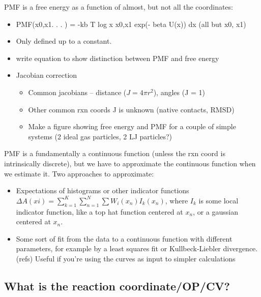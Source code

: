\documentclass[9pt]{livecoms}
\begin{document}
PMF is a free energy as a function of almost, but not all the coordinates:
\begin{itemize}
\item PMF(x0,x1. . . ) = -kb T log x  x0,x1 exp(- beta U(x)) dx (all but x0, x1)
\item Only defined up to a constant.
\item write equation to show distinction between PMF and free energy
\item Jacobian correction
\begin{itemize}
\item Common jacobians -- distance ($ J= 4 \pi r^2$), angles (J = 1)
\item Other common rxn coords J is unknown (native contacts, RMSD)
\item Make a figure showing free energy and PMF for a couple of simple systems (2 ideal gas particles, 2 LJ particles?)
\end{itemize}
\end{itemize}

PMF is a fundamentally a continuous function (unless the rxn coord is intrinsically discrete), but we have to approximate the continuous function when we estimate it. Two approaches to approximate:
\begin{itemize}
\item Expectations of histograms or other indicator functions
$\Delta A(xi) = \sum_{k=1}^K \sum_{n=1}^N \sum W_i(x_n) I_k(x_n)$, where $I_k$ is some local indicator function, like a top hat function centered at $x_n$, or a gaussian centered at $x_n$.
\item Some sort of fit from the data to a continuous function with different parameters, for example by a least squares fit or Kullbeck-Liebler divergence. (refs)  Useful if you're using the curves as input to simpler calculations
\end{itemize}

\subsection{What is the reaction coordinate/OP/CV?}
\end{document}
